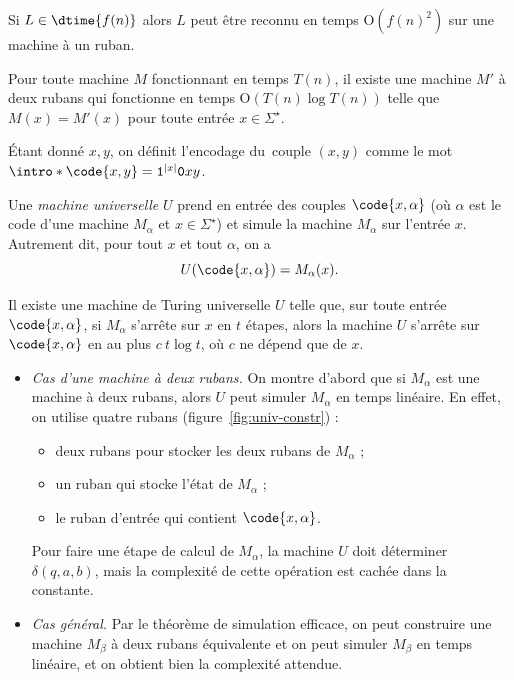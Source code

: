 \documentclass[./main]{subfiles}
\begin{document}
  \begin{thm}
    Si $L \in \dtime{f(n)}$ alors  $L$ peut être reconnu en temps $\mathrm{O}(f(n)^2)$ sur une machine à un ruban.
  \end{thm}

  \begin{thm}
    Pour toute machine $M$ fonctionnant en temps $T(n)$, il existe une machine $M'$ à deux rubans qui fonctionne en temps $\mathrm{O}(T(n) \log T(n))$ telle que $M(x) = M'(x)$ pour toute entrée $x \in \Sigma^\star$.
  \end{thm}

  \begin{defn}
    Étant donné $x, y$, on définit l'encodage du~couple $(x,y)$ comme le mot $\intro*\code{x, y} = \texttt{1}^{|x|} \texttt{0} x y$.
  \end{defn}

  \begin{defn}
    Une \textit{machine universelle} $U$ prend en entrée des couples $\code{x,\alpha}$ (où $\alpha$ est le code d'une machine $M_\alpha$ et $x \in \Sigma^\star$) et simule la machine $M_\alpha$ sur l'entrée $x$.
    Autrement dit, pour tout $x$ et tout $\alpha$, on a 
    \[
      U(\code{x, \alpha}) = M_\alpha(x)
    .\]
  \end{defn}

  \begin{thm}
    Il existe une machine de Turing universelle $U$ telle que, sur toute entrée $\code{x, \alpha}$, si  $M_\alpha$ s'arrête sur $x$ en $t$ étapes, alors la machine $U$ s'arrête sur $\code{x, \alpha}$ en au plus $c\: t \log t$, où $c$ ne dépend que de $x$.
  \end{thm}
  \begin{prv}
    \begin{itemize}
      \item \textit{Cas d'une machine à deux rubans.}
        On montre d'abord que si $M_\alpha$ est une machine à deux rubans, alors $U$ peut simuler $M_\alpha$ en temps linéaire.
        En effet, on utilise quatre rubans (figure~\ref{fig:univ-constr}) :
        \begin{itemize}
          \item deux rubans pour stocker les deux rubans de $M_\alpha$ ;
          \item un ruban qui stocke l'état de $M_\alpha$ ;
          \item le ruban d'entrée qui contient $\code{x, \alpha}$.
        \end{itemize}

        Pour faire une étape de calcul de $M_\alpha$, la machine $U$ doit déterminer $\delta(q, a, b)$, mais la complexité de cette opération est cachée dans la constante.
      \item \textit{Cas général.}
        Par le théorème de simulation efficace, on peut construire une machine $M_\beta$ à deux rubans équivalente et on peut simuler $M_\beta$ en temps linéaire, et on obtient bien la complexité attendue.
    \end{itemize}
  \end{prv}
\end{document}
